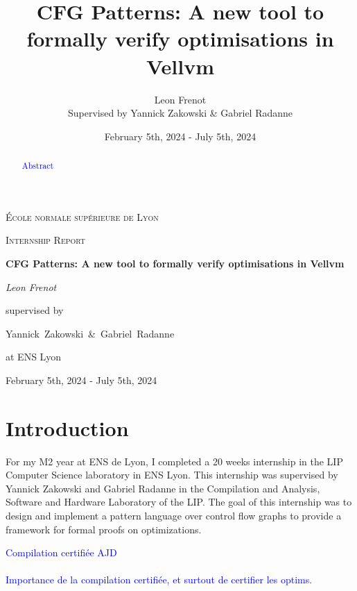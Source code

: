 \documentclass[11pt]{article}
\newcommand{\leon}[1]{\textcolor{blue}{#1}}
\begin{document}
\title{CFG Patterns: A new tool to formally verify optimisations in Vellvm}

\author{Leon Frenot\\ Supervised by Yannick Zakowski \& Gabriel Radanne}

\date{February 5th, 2024 - July 5th, 2024}

\begin{titlepage}
  \centering
  {\textsc{École normale supérieure de Lyon} \par}
  \vspace{1cm}
  {\Large \textsc{Internship Report}\par}
  \vspace{1.5cm}
  {\huge\bfseries CFG Patterns: A new tool to formally verify optimisations in Vellvm\par}
  \vspace{2cm}
  {\Large\itshape Leon Frenot\par}
  \vfill
  supervised by\par
  Yannick~Zakowski~\&~Gabriel~Radanne\par
  at ENS Lyon
  \vfill

  {\large February 5th, 2024 - July 5th, 2024\par}
\end{titlepage}

\tableofcontents
\newpage

\hypersetup{colorlinks=true, linkcolor=red}

\begin{abstract}
  \leon{Abstract}
\end{abstract}

\section{Introduction}
\label{sec:intro}

\indent
For my M2 year at ENS de Lyon, I completed a 20 weeks internship in the LIP Computer Science laboratory in ENS Lyon. This internship was supervised by Yannick Zakowski and Gabriel Radanne in the Compilation and Analysis, Software and Hardware Laboratory of the LIP. The goal of this internship was to design and implement a pattern language over control flow graphs to provide a framework for formal proofs on optimizations.

\leon{Compilation certifiée AJD}

\paragraph{}
\leon{Importance de la compilation certifiée, et surtout de certifier les optims.}
\end{document}
